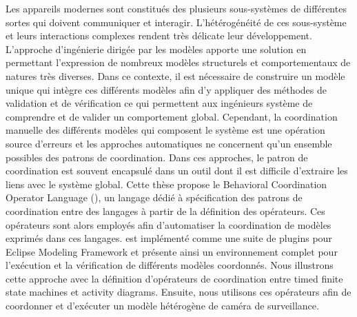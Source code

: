 
\begin{frenchabstract}
Les appareils modernes sont constitués des plusieurs sous-systèmes de différentes sortes qui doivent communiquer et interagir. L'hétérogénéité de ces sous-système et leurs interactions complexes rendent très délicate leur développement. L'approche d'ingénierie dirigée par les modèles apporte une solution en permettant l'expression de nombreux modèles structurels et comportementaux de natures très diverses. Dans ce contexte, il est nécessaire de construire un modèle unique qui intègre ces différents modèles afin d'y appliquer des méthodes de validation et de vérification ce qui permettent aux ingénieurs système de comprendre et de valider un comportement global. Cependant, la coordination manuelle des différents modèles qui composent le système est une opération source d'erreurs et les approches automatiques ne concernent qu'un ensemble possibles des patrons de coordination. Dans ces approches, le patron de coordination est souvent encapsulé dans un outil dont il est difficile d'extraire les liens avec le système global. Cette thèse propose le Behavioral Coordination Operator Language (\bcool), un langage dédié à spécification des patrons de coordination entre des langages à partir de la définition des opérateurs. Ces opérateurs sont alors employés afin d'automatiser la coordination de modèles exprimés dans ces langages. \bcool est implémenté comme une suite de plugins pour Eclipse Modeling Framework et présente ainsi un environnement complet pour l'exécution et la vérification de différents modèles coordonnés. Nous illustrons cette approche avec la définition d'opérateurs de coordination entre timed finite state machines et activity diagrams. Ensuite, nous utilisons ces opérateurs afin de coordonner et d'exécuter un modèle hétérogène de caméra de surveillance.
\end{frenchabstract}



\cleardoublepage
{}


